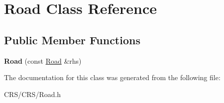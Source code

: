 \hypertarget{class_road}{}\section{Road Class Reference}
\label{class_road}
\subsection*{Public Member Functions}
\begin{DoxyCompactItemize}
\item 
\mbox{\label{class_road_a1c08a202931ca208e6a753148f1a0056}} 
{\bfseries Road} (const \hyperlink{class_road}{Road} \&rhs)
\end{DoxyCompactItemize}


The documentation for this class was generated from the following file\+:\begin{DoxyCompactItemize}
\item 
C\+R\+S/\+C\+R\+S/Road.\+h\end{DoxyCompactItemize}
